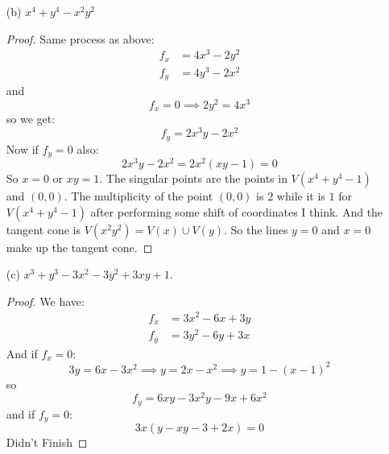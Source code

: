 \documentclass{article}
\begin{document}
\begin{itemize}
        \item [(b)] $x^{4} + y^{4} - x^{2}y^{2}$
            \begin{proof}
                Same process as above:
                    \begin{align*}
                        f_{x} &= 4x^{3} - 2y^{2} \\
                        f_{y} &= 4y^{3} - 2x^{2}   
                    \end{align*}
                and 
                    \begin{equation*}
                        f_{x} = 0 \implies 2y^{2} = 4x^{3}
                    \end{equation*}
                so we get:
                    \begin{equation*}
                        f_{y} = 2x^{3}y - 2x^{2}
                    \end{equation*}
                Now if $f_{y} = 0$ also:
                    \begin{equation*}
                        2x^{3}y - 2x^{2} = 2x^{2}(xy - 1) = 0
                    \end{equation*}
                So $x = 0$ or $xy = 1$. The singular points are the points in $V(x^{4} + y^{4} - 1)$ and $(0, 0)$. The multiplicity of the point $(0, 0)$ is $2$ while it is $1$ for $V(x^{4} + y^{4} - 1)$ after performing some shift of coordinates I think. And the tangent cone is $V(x^{2}y^{2}) = V(x) \cup V(y)$. So the lines $y = 0$ and $x = 0$ make up the tangent cone.
            \end{proof}

        \item  [(c)] $x^{3} + y^{3} - 3x^{2} - 3y^{2} + 3xy + 1$. 
            \begin{proof}
                We have:
                    \begin{align*}
                        f_{x} &= 3x^{2} - 6x + 3y \\
                        f_{y} &= 3y^{2} - 6y + 3x   
                    \end{align*}
                And if $f_{x} = 0$:
                    \begin{equation*}
                        3y = 6x - 3x^{2} \implies y = 2x - x^{2} \implies y = 1-(x - 1)^{2}
                    \end{equation*}
                so
                    \begin{equation*}
                        f_{y} = 6xy - 3x^{2}y - 9x + 6x^{2}
                    \end{equation*}
                and if $f_{y} = 0$:
                    \begin{equation*}
                        3x(y - xy - 3 + 2x) = 0
                    \end{equation*}
                Didn't Finish
            \end{proof}
    \end{itemize}
\end{document}
